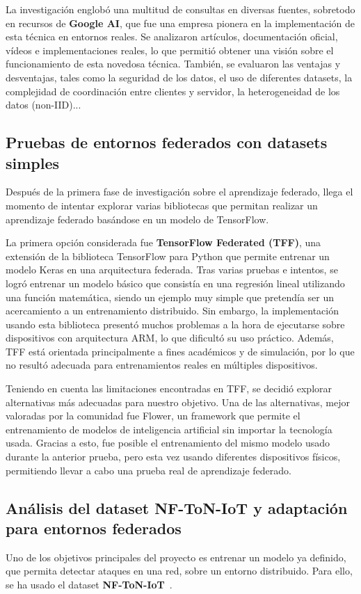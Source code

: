 La investigación englobó una multitud de consultas en diversas fuentes, sobretodo en recursos de \textbf{Google AI}, que fue una empresa pionera en la implementación de esta técnica en entornos reales. Se analizaron artículos, documentación oficial, vídeos e implementaciones reales, lo que permitió obtener una visión sobre el funcionamiento de esta novedosa técnica. También, se evaluaron las ventajas y desventajas, tales como la seguridad de los datos, el uso de diferentes datasets, la complejidad de coordinación entre clientes y servidor, la heterogeneidad de los datos (non-IID)... 

\subsection{Pruebas de entornos federados con datasets simples}
\label{subsec:PruebasEntornosFederados}
Después de la primera fase de investigación sobre el aprendizaje federado, llega el momento de intentar explorar varias bibliotecas que permitan realizar un aprendizaje federado basándose en un modelo de TensorFlow.

La primera opción considerada fue \textbf{TensorFlow Federated (TFF)}, una extensión de la biblioteca TensorFlow para Python que permite entrenar un modelo Keras en una arquitectura federada. Tras varias pruebas e intentos, se logró entrenar un modelo básico que consistía en una regresión lineal utilizando una función matemática, siendo un ejemplo muy simple que pretendía ser un acercamiento a un entrenamiento distribuido. Sin embargo, la implementación usando esta biblioteca presentó muchos problemas a la hora de ejecutarse sobre dispositivos con arquitectura ARM, lo que dificultó su uso práctico. Además, TFF está orientada principalmente a fines académicos y de simulación, por lo que no resultó adecuada para entrenamientos reales en múltiples dispositivos.

Teniendo en cuenta las limitaciones encontradas en TFF, se decidió explorar alternativas más adecuadas para nuestro objetivo. Una de las alternativas, mejor valoradas por la comunidad fue Flower, un framework que permite el entrenamiento de modelos de inteligencia artificial sin importar la tecnología usada. Gracias a esto, fue posible el entrenamiento del mismo modelo usado durante la anterior prueba, pero esta vez usando diferentes dispositivos físicos, permitiendo llevar a cabo una prueba real de aprendizaje federado.

\subsection{Análisis del dataset NF-ToN-IoT y adaptación para entornos federados}
\label{subsec:AnalisisDataset}
Uno de los objetivos principales del proyecto es entrenar un modelo ya definido, que permita detectar ataques en una red, sobre un entorno distribuido. Para ello, se ha usado el dataset \textbf{NF-ToN-IoT}~\cite{dataset_source}.

